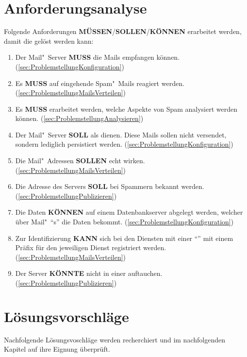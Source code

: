 \documentclass[a4paper,11pt,singlespacing]{article}
\begin{document}
\newpage


\section{Anforderungsanalyse}\label{sec:Anforderungsanalyse}
	Folgende Anforderungen \textbf{MÜSSEN}/\textbf{SOLLEN}/\textbf{KÖNNEN} erarbeitet werden, damit die  gelöst werden kann:

	\begin{enumerate}
	\item
		Der Mail"~Server \textbf{MUSS} die Mails empfangen können.
		(\ref{sec:ProblemstellungKonfiguration})
	\item
		Es \textbf{MUSS} auf eingehende Spam"~Mails reagiert werden.
		(\ref{sec:ProblemstellungMailsVerteilen})
	\item
		Es \textbf{MUSS} erarbeitet werden, welche Aspekte von Spam analysiert werden können.
		(\ref{sec:ProblemstellungAnalysieren})
	\item
		Der Mail"~Server \textbf{SOLL} als  dienen.
		Diese Mails sollen nicht versendet, sondern lediglich persistiert werden.
		(\ref{sec:ProblemstellungKonfiguration})
	\item
		Die Mail"~Adressen \textbf{SOLLEN} echt wirken.
		(\ref{sec:ProblemstellungMailsVerteilen})
	\item
		Die Adresse des  Servers \textbf{SOLL} bei Spammern bekannt werden.
		(\ref{sec:ProblemstellungPublizieren})
	\item
		Die Daten \textbf{KÖNNEN} auf einem Datenbankserver abgelegt werden, welcher über Mail"~"`s"' die Daten bekommt.
		(\ref{sec:ProblemstellungKonfiguration})
	\item
		Zur Identifizierung \textbf{KANN} sich bei den Diensten mit einer "`"' mit einem Präfix für den jeweiligen Dienst registriert werden.
		(\ref{sec:ProblemstellungMailsVerteilen})
	\item
		Der Server \textbf{KÖNNTE} nicht in einer   auftauchen.
		(\ref{sec:ProblemstellungPublizieren})
	\end{enumerate}

\newpage


\section{Lösungsvorschläge}\label{sec:Lösungsvorschläge}
	Nachfolgende Lösungsvoschläge werden recherchiert und im nachfolgenden Kapitel auf ihre Eignung überprüft.
\end{document}
